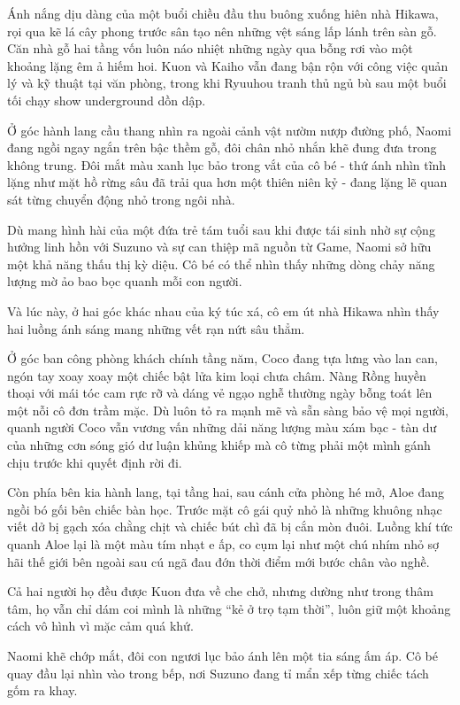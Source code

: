 ﻿\documentclass[../main.tex]{subfiles}
\begin{document}
Ánh nắng dịu dàng của một buổi chiều đầu thu buông xuống hiên nhà Hikawa, rọi qua kẽ lá cây phong trước sân tạo nên những vệt sáng lấp lánh trên sàn gỗ. Căn nhà gỗ hai tầng vốn luôn náo nhiệt những ngày qua bỗng rơi vào một khoảng lặng êm ả hiếm hoi. Kuon và Kaiho vẫn đang bận rộn với công việc quản lý và kỹ thuật tại văn phòng, trong khi Ryuuhou tranh thủ ngủ bù sau một buổi tối chạy show underground dồn dập.

Ở góc hành lang cầu thang nhìn ra ngoài cảnh vật nườm nượp đường phố, Naomi đang ngồi ngay ngắn trên bậc thềm gỗ, đôi chân nhỏ nhắn khẽ đung đưa trong không trung. Đôi mắt màu xanh lục bảo trong vắt của cô bé - thứ ánh nhìn tĩnh lặng như mặt hồ rừng sâu đã trải qua hơn một thiên niên kỷ - đang lặng lẽ quan sát từng chuyển động nhỏ trong ngôi nhà.

Dù mang hình hài của một đứa trẻ tám tuổi sau khi được tái sinh nhờ sự cộng hưởng linh hồn với Suzuno và sự can thiệp mã nguồn từ Game, Naomi sở hữu một khả năng thấu thị kỳ diệu. Cô bé có thể nhìn thấy những dòng chảy năng lượng mờ ảo bao bọc quanh mỗi con người.

Và lúc này, ở hai góc khác nhau của ký túc xá, cô em út nhà Hikawa nhìn thấy hai luồng ánh sáng mang những vết rạn nứt sâu thẳm.

Ở góc ban công phòng khách chính tầng năm, Coco đang tựa lưng vào lan can, ngón tay xoay xoay một chiếc bật lửa kim loại chưa châm. Nàng Rồng huyền thoại với mái tóc cam rực rỡ và dáng vẻ ngạo nghễ thường ngày bỗng toát lên một nỗi cô đơn trầm mặc. Dù luôn tỏ ra mạnh mẽ và sẵn sàng bảo vệ mọi người, quanh người Coco vẫn vương vấn những dải năng lượng màu xám bạc - tàn dư của những cơn sóng gió dư luận khủng khiếp mà cô từng phải một mình gánh chịu trước khi quyết định rời đi.

Còn phía bên kia hành lang, tại tầng hai, sau cánh cửa phòng hé mở, Aloe đang ngồi bó gối bên chiếc bàn học. Trước mặt cô gái quỷ nhỏ là những khuông nhạc viết dở bị gạch xóa chằng chịt và chiếc bút chì đã bị cắn mòn đuôi. Luồng khí tức quanh Aloe lại là một màu tím nhạt e ấp, co cụm lại như một chú nhím nhỏ sợ hãi thế giới bên ngoài sau cú ngã đau đớn thời điểm mới bước chân vào nghề.

Cả hai người họ đều được Kuon đưa về che chở, nhưng dường như trong thâm tâm, họ vẫn chỉ dám coi mình là những ``kẻ ở trọ tạm thời'', luôn giữ một khoảng cách vô hình vì mặc cảm quá khứ.

Naomi khẽ chớp mắt, đôi con ngươi lục bảo ánh lên một tia sáng ấm áp. Cô bé quay đầu lại nhìn vào trong bếp, nơi Suzuno đang tỉ mẩn xếp từng chiếc tách gốm ra khay.
\end{document}
